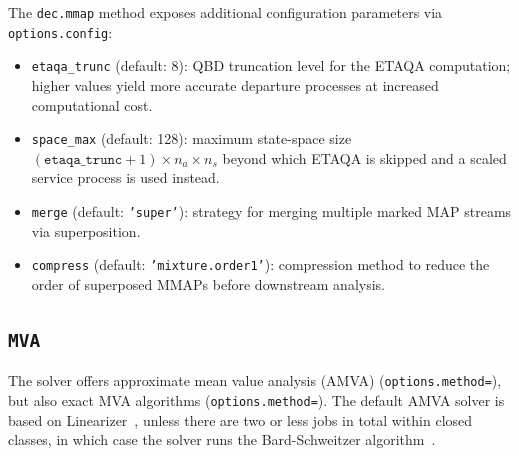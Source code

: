 The \texttt{dec.mmap} method exposes additional configuration parameters via \texttt{options.config}:
\begin{itemize}
\item \texttt{etaqa\_trunc} (default: 8): QBD truncation level for the ETAQA computation; higher values yield more accurate departure processes at increased computational cost.
\item \texttt{space\_max} (default: 128): maximum state-space size $(\texttt{etaqa\_trunc}+1) \times n_a \times n_s$ beyond which ETAQA is skipped and a scaled service process is used instead.
\item \texttt{merge} (default: \texttt{'super'}): strategy for merging multiple marked MAP streams via superposition.
\item \texttt{compress} (default: \texttt{'mixture.order1'}): compression method to reduce the order of superposed MMAPs before downstream analysis.
\end{itemize}


\subsection{\texttt{MVA}}
The solver offers approximate mean value analysis (AMVA) (\texttt{options.method=}), but also exact MVA algorithms (\texttt{options.method=}). The default AMVA solver is based on Linearizer~\cite{ChaN82}, unless there are two or less jobs in total within closed classes, in which case the solver runs the Bard-Schweitzer algorithm~\cite{Sch79}.


